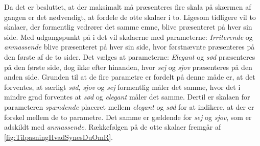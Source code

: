 Da det er besluttet, at der maksimalt må præsenteres fire skala på skærmen af gangen er det nødvendigt, at fordele de otte skalaer i to. Ligesom tidligere vil to skalaer, der formentlig vedrører det samme emne, blive præsenteret på hver sin side. Med udgangspunkt på i det vil skalaerne med parameterne: \textit{Irriterende} og \textit{anmassende} blive præsenteret på hver sin side, hvor førstnævnte præsenteres på den første af de to sider. Det vælges at parameterne: \textit{Elegant} og \textit{sød} præsenteres på den første side, dog ikke efter hinanden, hvor \textit{sej} og \textit{sjov} præsenteres på den anden side. Grunden til at de fire parametre er fordelt på denne måde er, at det forventes, at særligt \textit{sød}, \textit{sjov} og \textit{sej} formentlig måler det samme, hvor det i mindre grad forventes at \textit{sød} og \textit{elegant} måler det samme. Dertil er skalaen for parameteren \textit{spændende} placeret mellem \textit{elegant} og \textit{sød} for at indikere, at der er forskel mellem de to parametre. Det samme er gældende for \textit{sej} og \textit{sjov}, som er adskildt med \textit{anmassende}. Rækkefølgen på de otte skalaer fremgår af \autoref{fig:TilpasningHvadSynesDuOmR}.
\newpage
%
